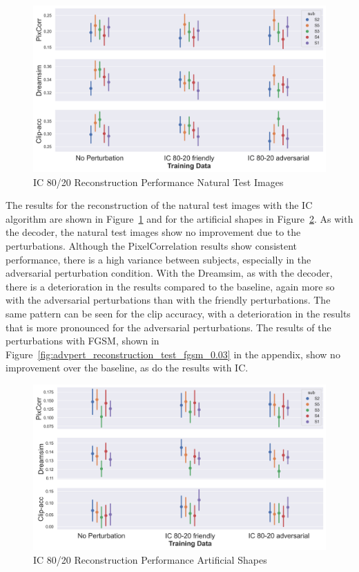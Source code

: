 \begin{figure}[ht]
    \centering
    \includegraphics[width=1\textwidth]{plots/advpert_reconstruction_test_ic_80-20.png}
    \caption{IC 80/20 Reconstruction Performance Natural Test Images}\label{fig:advpert_reconstruction_test_ic_80}
\end{figure}

The results for the reconstruction of the natural test images with the IC algorithm are shown in Figure~\ref{fig:advpert_reconstruction_test_ic_80} and for the artificial shapes in Figure~\ref{fig:advpert_reconstruction_art_ic_80}. As with the decoder, the natural test images show no improvement due to the perturbations. Although the PixelCorrelation results show consistent performance, there is a high variance between subjects, especially in the adversarial perturbation condition. With the Dreamsim, as with the decoder, there is a deterioration in the results compared to the baseline, again more so with the adversarial perturbations than with the friendly perturbations. The same pattern can be seen for the clip accuracy, with a deterioration in the results that is more pronounced for the adversarial perturbations. The results of the perturbations with FGSM, shown in Figure~\ref{fig:advpert_reconstruction_test_fgsm_0.03} in the appendix, show no improvement over the baseline, as do the results with IC. 

\begin{figure}[ht]
    \centering
    \includegraphics[width=1\textwidth]{plots/advpert_reconstruction_art_ic_80-20.png}
    \caption{IC 80/20 Reconstruction Performance Artificial Shapes}\label{fig:advpert_reconstruction_art_ic_80}
\end{figure}

